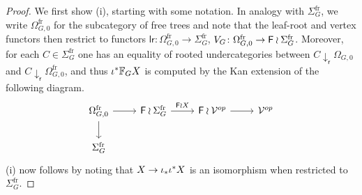 \documentclass[a4paper,10pt]{article}%
\begin{document}
\begin{proof}
We first show (i), starting with some notation. 
In analogy with $\Sigma_{G}^{\text{fr}}$,
we write $\Omega_{G,0}^{\text{fr}}$ for the subcategory of free trees and note that the leaf-root and vertex functors then restrict to functors
$\mathsf{lr} \colon \Omega_{G,0}^{\text{fr}} \to \Sigma_G^{\text{fr}}$,
$V_G \colon \Omega_{G,0}^{\text{fr}} \to \mathsf{F} \wr \Sigma_G^{\text{fr}}$.
Moreover, for each $C \in \Sigma_G^{\text{fr}}$ one has an equality of rooted undercategories between
$C \downarrow_{\mathsf{r}} \Omega_{G,0}$
and
$C \downarrow_{\mathsf{r}} \Omega_{G,0}^{\text{fr}}$,
and thus 
$\iota^{\**} \mathbb{F}_G X$ is computed by the Kan extension of the following diagram.
\begin{equation}\label{IFGI EQ}
\begin{tikzcd}
	\Omega_{G,0}^{\text{fr}} \ar{d} \ar{r} &
	\Fin \wr \Sigma_G^{\text{fr}} \ar{r}{\Fin \wr X} &
	\Fin \wr \mathcal{V}^{op} \ar{r} &
	\mathcal{V}^{op}
\\
	\Sigma_G^{\text{fr}}
\end{tikzcd}
\end{equation}
(i) now follows by noting that 
$X \to \iota_{\**} \iota^{\**} X$
is an isomorphism when restricted to $\Sigma_G^{\text{fr}}$.


\end{proof}
\end{document}
